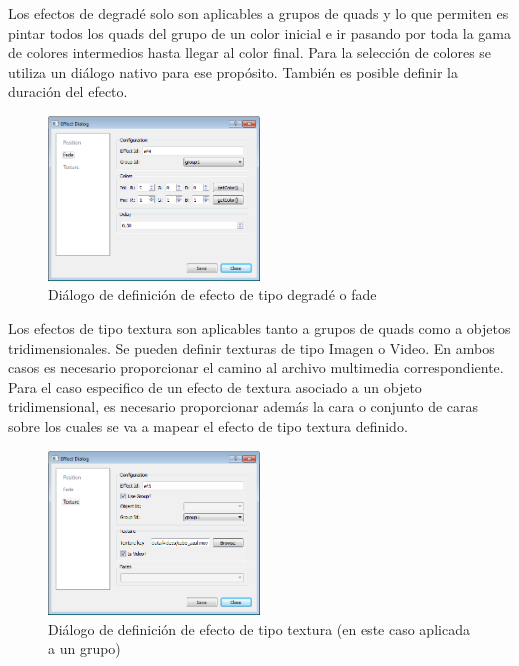 Los efectos de degradé solo son aplicables a grupos de quads y lo que permiten es pintar todos los quads del grupo de un color inicial e ir pasando por toda la gama de colores intermedios hasta llegar al color final. Para la selección de colores se utiliza un diálogo nativo para ese propósito. También es posible definir la duración del efecto.

\begin{figure}[H]
  \centering
    \includegraphics[width=0.5\textwidth]{./Cap5_vmt/vmt_EfectDialog2.png}
  \caption{Diálogo de definición de efecto de tipo degradé o fade}
  \label{fig:VMT-EffectFade}
\end{figure}

Los efectos de tipo textura son aplicables tanto a grupos de quads como a objetos tridimensionales. Se pueden definir texturas de tipo Imagen o Video. En ambos casos es necesario proporcionar el camino al archivo multimedia correspondiente. Para el caso especifico de un efecto de textura asociado a un objeto tridimensional, es necesario proporcionar además la cara o conjunto de caras sobre los cuales se va a mapear el efecto de tipo textura definido.

\begin{figure}[H]
  \centering
    \includegraphics[width=0.5\textwidth]{./Cap5_vmt/vmt_EfectDialog3.png}
  \caption{Diálogo de definición de efecto de tipo textura (en este caso aplicada a un grupo)}
  \label{fig:VMT-EffectTexture}
\end{figure}

